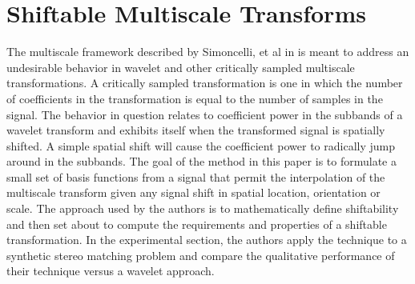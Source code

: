 \documentclass[letterpaper]{article}
\date{\today}
\begin{document}
\maketitle

\section{Shiftable Multiscale Transforms}
The multiscale framework described by Simoncelli, et al
in\cite{shift-multi} is meant to address an undesirable behavior in
wavelet and other critically sampled multiscale transformations.  A
critically sampled transformation is one in which the number of
coefficients in the transformation is equal to the number of samples
in the signal.  The behavior in question relates to coefficient power
in the subbands of a wavelet transform and exhibits itself when the
transformed signal is spatially shifted.  A simple spatial shift will
cause the coefficient power to radically jump around in the subbands.
The goal of the method in this paper is to formulate a small set of
basis functions from a signal that permit the interpolation of the
multiscale transform given any signal shift in spatial location,
orientation or scale.  The approach used by the authors is to
mathematically define shiftability and then set about to compute the
requirements and properties of a shiftable transformation.  In the
experimental section, the authors apply the technique to a synthetic
stereo matching problem and compare the qualitative performance of
their technique versus a wavelet approach.






\end{document}
